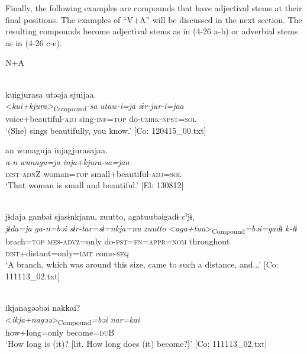   Finally, the following examples are compounds that have adjectival stems at their final positions. The examples of “V+A” will be discussed in the next section. The resulting compounds become adjectival stems as in (4-26 a-b) or adverbial stems as in (4-26 c-e).

\ea 
\exi{} N+A \label{ex:4.26}

\ea{}\\
\glll    kuigjurasa  utəəja  sjuijaa.\\
      <\textit{kui+kjura>}\textsubscript{Compound}\textit{{}-sa}  \textit{utaw-i=ja}  \textit{sɨr-jur-i=jaa}\\
      voice+beautiful-\textsc{adj}  sing-\textsc{inf}=\textsc{top}  do-\textsc{umrk}-\textsc{npst}=\textsc{sol}\\
      \glt       ‘(She) sings beautifully, you know.’ [Co: 120415\_00.txt]


\ex\label{ex:4.26b}  
     \glll  an  wunaguja  injagjurasajaa.\\
      \textit{a-n}  \textit{wunagu=ja}  \textit{inja+kjura-sa=jaa}\\
      \textsc{dist}-\textsc{adn}Z  woman=\textsc{top}  small+beautiful-\textsc{adj}=\textsc{sol}\\
      \glt       ‘That woman is small and beautiful.’ [El: 130812]


\ex{}\\\label{ex:4.26c}
\glll     jɨdaja  ganbəi  sjasɨnkjanu,  {\textbar}zuutto{\textbar},   agatuubəigadɨ  cˀjɨ,\\
      \textit{jɨda=ja}  \textit{ga-n=bəi}  \textit{sɨr-tar=sɨ=nkja=nu}  \textit{zuutto}     <\textit{aga+tuu}>\textsubscript{Compound}\textit{=bəi=gadɨ}  \textit{k-tɨ}\\
      brach=\textsc{top}  \textsc{mes}-\textsc{advz}=only  do-\textsc{pst}=\textsc{fn}=\textsc{appr}=\textsc{nom}  throughout   \textsc{dist}+distant=only=\textsc{lmt}  come-\textsc{seq}     \\
    \glt       ‘A branch, which was around this size, came to such a distance, and...’ [Co: 111113\_02.txt]


\ex{}\\\label{ex:4.26d}
\glll     ikjanagəəbəi  nakkai?\\
      <\textit{ikja+nagəə}>\textsubscript{Compound}\textit{=bəi}  \textit{nar=kai}\\
      how+long=only  become=\textsc{du}B\\
    \glt       ‘How long is (it)? [lit. How long does (it) become?]’ [Co: 111113\_02.txt]

